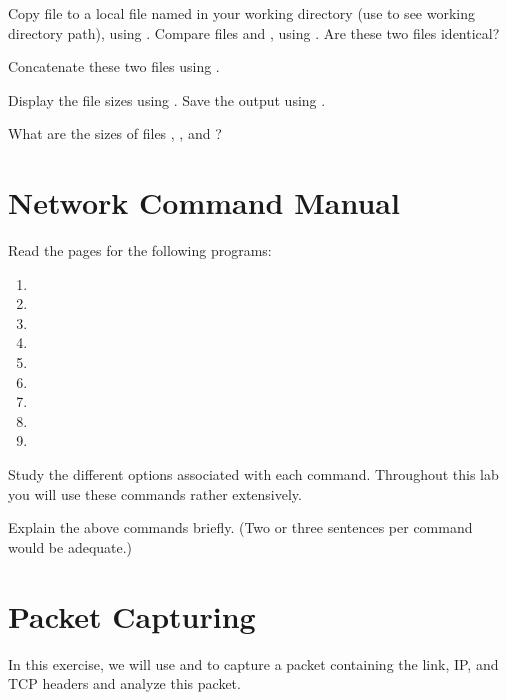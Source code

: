 \documentclass{../UTNetLab}
\begin{document}
Copy  file to a local file named  in your working directory (use  to see working directory path),
using .
Compare files  and , using .
Are these two files identical?

Concatenate these two files using .

Display the file sizes using .
Save the output using .

\begin{report}
    \item What are the sizes of files , , and ?
\end{report}

\section{Network Command Manual}
Read the  pages for the following programs:
\begin{multicols}{3}
    \begin{enumerate}
        \item {}
        \item {}
        \item {}
        \item {}
        \item {}
        \item {}
        \item {}
        \item {}
        \item {}
    \end{enumerate}
\end{multicols}
Study the different options associated with each command.
Throughout this lab you will use these commands rather extensively.

\begin{report}
    \item Explain the above commands briefly.
    (Two or three sentences per command would be adequate.)
\end{report}

\section{Packet Capturing}
In this exercise, we will use  and  to capture a packet containing the link, IP, and TCP headers and analyze this packet.
\end{document}
